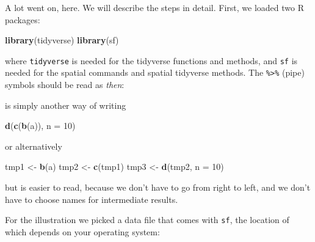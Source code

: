 \documentclass[]{krantz}
\newenvironment{Shaded}{\begin{snugshade}}{\end{snugshade}}
\newcommand{\KeywordTok}[1]{\textcolor[rgb]{0.13,0.29,0.53}{\textbf{#1}}}
\newcommand{\DataTypeTok}[1]{\textcolor[rgb]{0.13,0.29,0.53}{#1}}
\newcommand{\DecValTok}[1]{\textcolor[rgb]{0.00,0.00,0.81}{#1}}
\newcommand{\StringTok}[1]{\textcolor[rgb]{0.31,0.60,0.02}{#1}}
\newcommand{\OperatorTok}[1]{\textcolor[rgb]{0.81,0.36,0.00}{\textbf{#1}}}
\newcommand{\NormalTok}[1]{#1}
\theoremstyle{definition}
\theoremstyle{definition}
\theoremstyle{definition}
\theoremstyle{remark}
\begin{document}
A lot went on, here. We will describe the steps in detail. First, we
loaded two R packages:

\begin{Shaded}
\begin{Highlighting}[]
\KeywordTok{library}\NormalTok{(tidyverse)}
\KeywordTok{library}\NormalTok{(sf)}
\end{Highlighting}
\end{Shaded}

where \texttt{tidyverse} is needed for the tidyverse functions and
methods, and \texttt{sf} is needed for the spatial commands and spatial
tidyverse methods. The \texttt{\%\textgreater{}\%} (pipe) symbols should
be read as \emph{then}:

\begin{Shaded}
\end{Shaded}

is simply another way of writing

\begin{Shaded}
\begin{Highlighting}[]
\KeywordTok{d}\NormalTok{(}\KeywordTok{c}\NormalTok{(}\KeywordTok{b}\NormalTok{(a)), }\DataTypeTok{n =} \DecValTok{10}\NormalTok{)}
\end{Highlighting}
\end{Shaded}

or alternatively

\begin{Shaded}
\begin{Highlighting}[]
\NormalTok{tmp1 <-}\StringTok{ }\KeywordTok{b}\NormalTok{(a)}
\NormalTok{tmp2 <-}\StringTok{ }\KeywordTok{c}\NormalTok{(tmp1)}
\NormalTok{tmp3 <-}\StringTok{ }\KeywordTok{d}\NormalTok{(tmp2, }\DataTypeTok{n =} \DecValTok{10}\NormalTok{)}
\end{Highlighting}
\end{Shaded}

but is easier to read, because we don't have to go from right to left,
and we don't have to choose names for intermediate results.

For the illustration we picked a data file that comes with \texttt{sf},
the location of which depends on your operating system:
\end{document}

